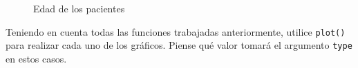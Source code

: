 \documentclass{../prob}
\begin{document}
\begin{problema}
\begin{parte}
\begin{figure}[!ht]
    \centering
    \caption{Edad de los pacientes}
    \label{fig:hist23}
\end{figure}

	Teniendo en cuenta todas las funciones trabajadas anteriormente, utilice \texttt{plot()} para realizar cada uno de los gráficos. Piense qué valor tomará el argumento \texttt{type} en estos casos.

	\end{parte}
	
	\end{problema}
\end{document}
